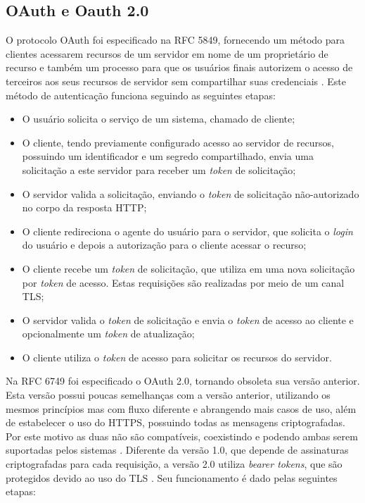 \subsection{OAuth e Oauth 2.0}

O protocolo OAuth foi especificado na RFC 5849, fornecendo um método para clientes acessarem 
recursos de um servidor em nome de um proprietário de recurso e também um processo para que os 
usuários finais autorizem o acesso de terceiros aos seus recursos de servidor sem compartilhar suas
credenciais \cite{RFC5849}. Este método de autenticação funciona seguindo as seguintes etapas:

\begin{itemize}
\item O usuário solicita o serviço de um sistema, chamado de cliente;
\item O cliente, tendo previamente configurado acesso ao servidor de recursos, possuindo um 
identificador e um segredo compartilhado, envia uma solicitação a este servidor para receber um 
\emph{token} de solicitação;
\item O servidor valida a solicitação, enviando o \emph{token} de solicitação não-autorizado no 
corpo da resposta HTTP;
\item O cliente redireciona o agente do usuário para o servidor, que solicita o \emph{login} do 
usuário e depois a autorização para o cliente acessar o recurso;
\item O cliente recebe um \emph{token} de solicitação, que utiliza em uma nova solicitação por 
\emph{token} de acesso. Estas requisições são realizadas por meio de um canal TLS;
\item O servidor valida o \emph{token} de solicitação e envia o \emph{token} de acesso ao cliente e 
opcionalmente um \emph{token} de atualização;
\item O cliente utiliza o \emph{token} de acesso para solicitar os recursos do servidor.
\end{itemize}

Na RFC 6749 foi especificado o OAuth 2.0, tornando obsoleta sua versão anterior. Esta versão possui 
poucas semelhanças com a versão anterior, utilizando os mesmos princípios mas com fluxo diferente e 
abrangendo mais casos de uso, além de estabelecer o uso do HTTPS, possuindo todas as mensagens 
criptografadas. Por este motivo as duas não são compatíveis, coexistindo e podendo ambas serem 
suportadas pelos sistemas \cite{RFC6749}. Diferente da versão 1.0, que depende de assinaturas 
criptografadas para cada requisição, a versão 2.0 utiliza \emph{bearer tokens}, que são protegidos 
devido ao uso do TLS \cite{SIRIWARDENA2014}. Seu funcionamento é dado pelas seguintes etapas:

